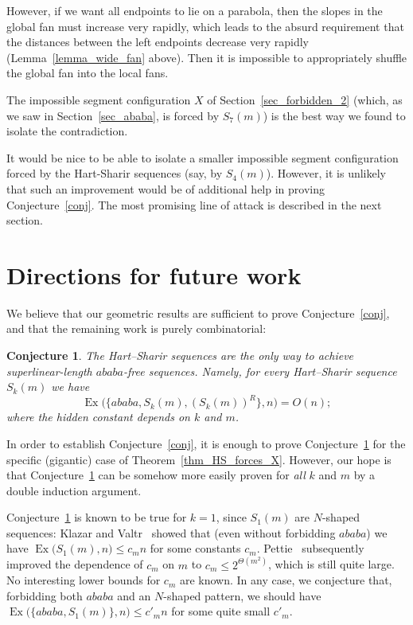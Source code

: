 \documentclass[11pt]{article}
\DeclareMathOperator{\Ex}{Ex}
\newtheorem{conjecture}[theorem]{Conjecture}
\theoremstyle{definition}
\theoremstyle{remark}
\begin{document}
However, if we want all endpoints to lie on a parabola, then the slopes in the global fan must increase very rapidly, which leads to the absurd requirement that the distances between the left endpoints decrease very rapidly (Lemma~\ref{lemma_wide_fan} above). Then it is impossible to appropriately shuffle the global fan into the local fans.

The impossible segment configuration $X$ of Section~\ref{sec_forbidden_2} (which, as we saw in Section~\ref{sec_ababa}, is forced by $S_7(m)$) is the best way we found to isolate the contradiction.

It would be nice to be able to isolate a smaller impossible segment configuration forced by the Hart-Sharir sequences (say, by $S_4(m)$). However, it is unlikely that such an improvement would be of additional help in proving Conjecture~\ref{conj}. The most promising line of attack is described in the next section.

\section{Directions for future work}\label{sec_conj_only_DS}

We believe that our geometric results are sufficient to prove Conjecture~\ref{conj}, and that the remaining work is purely combinatorial:

\begin{conjecture}\label{conj_only_HS}
The Hart--Sharir sequences are the only way to achieve superlinear-length $ababa$-free sequences. Namely, for every Hart--Sharir sequence $S_k(m)$ we have 
\begin{equation*}
\Ex\bigl(\bigl\{ababa, S_k(m), (S_k(m))^R\bigr\}, n\bigr)=O(n);
\end{equation*}
where the hidden constant depends on $k$ and $m$.
\end{conjecture}

In order to establish Conjecture~\ref{conj}, it is enough to prove Conjecture~\ref{conj_only_HS} for the specific (gigantic) case of Theorem~\ref{thm_HS_forces_X}. However, our hope is that Conjecture~\ref{conj_only_HS} can be somehow more easily proven for \emph{all} $k$ and $m$ by a double induction argument.

Conjecture~\ref{conj_only_HS} is known to be true for $k=1$, since $S_1(m)$ are $N$-shaped sequences: Klazar and Valtr~\cite{KV} showed that (even without forbidding $ababa$) we have $\Ex\bigl(S_1(m),n\bigr) \le c_m n$ for some constants $c_m$. Pettie~\cite{pettie_forbid} subsequently improved the dependence of $c_m$ on $m$ to $c_m \le 2^{\Theta(m^2)}$, which is still quite large. No interesting lower bounds for $c_m$ are known. In any case, we conjecture that, forbidding both $ababa$ and an $N$-shaped pattern, we should have $\Ex\bigl(\bigl\{ababa, S_1(m)\bigr\},n\bigr) \le c'_m n$ for some quite small $c'_m$.
\end{document}
